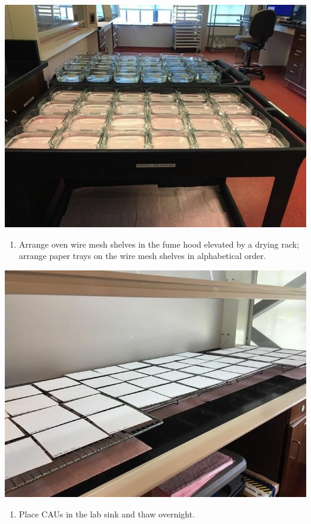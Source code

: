 \documentclass[
]{book}
\providecommand{\tightlist}{%
  \setlength{\itemsep}{0pt}\setlength{\parskip}{0pt}}
\begin{document}
\includegraphics{images/DailyTasks3.jpg}

\begin{enumerate}
\def\labelenumi{\arabic{enumi}.}
\setcounter{enumi}{3}
\tightlist
\item
  Arrange oven wire mesh shelves in the fume hood elevated by a drying rack; arrange paper trays on the wire mesh shelves in alphabetical order.
\end{enumerate}

\includegraphics{images/DailyTasks4.jpg}

\begin{enumerate}
\def\labelenumi{\arabic{enumi}.}
\setcounter{enumi}{4}
\tightlist
\item
  Place CAUs in the lab sink and thaw overnight.
\end{enumerate}
\end{document}
